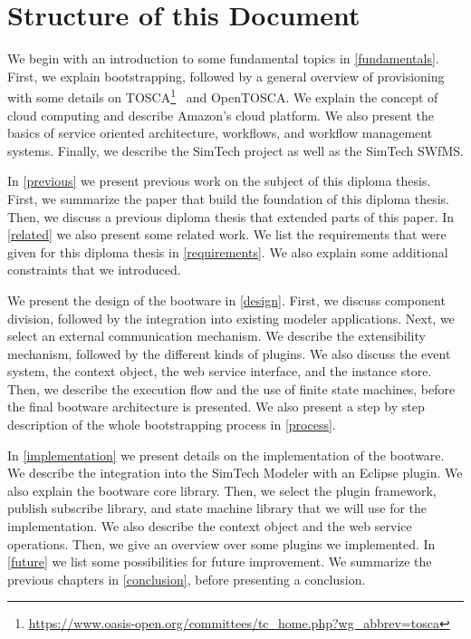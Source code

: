 \section{Structure of this Document}

We begin with an introduction to some fundamental topics in \autoref{fundamentals}.
First, we explain bootstrapping, followed by a general overview of provisioning with some details on TOSCA\footnote{\url{https://www.oasis-open.org/committees/tc_home.php?wg_abbrev=tosca}}~\autocite{tosca:spec} and OpenTOSCA.
We explain the concept of cloud computing and describe Amazon's cloud platform.
We also present the basics of service oriented architecture, workflows, and workflow management systems.
Finally, we describe the SimTech project as well as the SimTech SWfMS.

In \autoref{previous} we present previous work on the subject of this diploma thesis.
First, we summarize the paper that build the foundation of this diploma thesis.
Then, we discuss a previous diploma thesis that extended parts of this paper.
In \autoref{related} we also present some related work.
We list the requirements that were given for this diploma thesis in \autoref{requirements}.
We also explain some additional constraints that we introduced.

We present the design of the bootware in \autoref{design}.
First, we discuss component division, followed by the integration into existing modeler applications.
Next, we select an external communication mechanism.
We describe the extensibility mechanism, followed by the different kinds of plugins.
We also discuss the event system, the context object, the web service interface, and the instance store.
Then, we describe the execution flow and the use of finite state machines, before the final bootware architecture is presented.
We also present a step by step description of the whole bootstrapping process in \autoref{process}.

In \autoref{implementation} we present details on the implementation of the bootware.
We describe the integration into the SimTech Modeler with an Eclipse plugin.
We also explain the bootware core library.
Then, we select the plugin framework, publish subscribe library, and state machine library that we will use for the implementation.
We also describe the context object and the web service operations.
Then, we give an overview over some plugins we implemented.
In \autoref{future} we list some possibilities for future improvement.
We summarize the previous chapters in \autoref{conclusion}, before presenting a conclusion.
